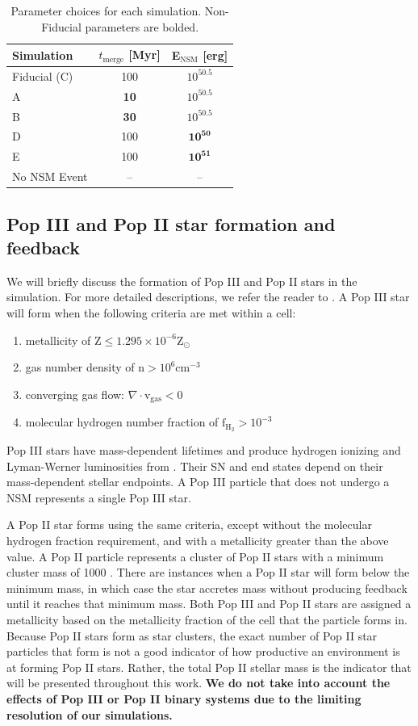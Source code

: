 \documentclass[fleqn,usenatbib]{mnras}
\begin{document}
\begin{table}
	\centering
	\begin{tabular}{lcc} 
		\hline
		Simulation & $t_{\textrm{merge}}$ [Myr] & E$_{\textrm{NSM}}$ [erg] \\
		\hline
		Fiducial (C) & 100 & $10^{50.5}$ \\
		A & \textbf{10} & $10^{50.5}$ \\
		B & \textbf{30} & $10^{50.5}$ \\
		D & 100 & $\mathbf{10^{50}}$ \\
		E & 100 & $\mathbf{10^{51}}$ \\
		No NSM Event & -- & -- \\
		\hline
	\end{tabular}
	\caption{Parameter choices for each simulation. Non-Fiducial parameters are bolded.}
	\label{tab:NSM_params}
\end{table}

\subsection{Pop III and Pop II star formation and feedback} \label{sec:star_formation}
We will briefly discuss the formation of Pop III and Pop II stars in the simulation. For more detailed descriptions, we refer the reader to \citet{Skinner20}. A Pop III star will form when the following criteria are met within a cell: 
\begin{enumerate}
	\item metallicity of $\mathrm{Z} \leq 1.295 \times 10^{-6} \mathrm{Z}_{\odot}$
	\item gas number density of $\mathrm{n} > 10^{6} \mathrm{cm}^{-3}$
	\item converging gas flow: $\nabla \cdot \mathrm{v}_{\mathrm{gas}} < 0$
	\item molecular hydrogen number fraction of $\mathrm{f}_{\mathrm{H}_{2}} > 10^{-3}$
\end{enumerate}
Pop III stars have mass-dependent lifetimes and produce hydrogen ionizing and Lyman-Werner luminosities from \citet{Schaerer02}. Their SN and end states depend on their mass-dependent stellar endpoints. A Pop III particle that does not undergo a NSM represents a single Pop III star. 

A Pop II star forms using the same criteria, except without the molecular hydrogen fraction requirement, and with a metallicity greater than the above value. A Pop II particle represents a cluster of Pop II stars with a minimum cluster mass of 1000 \Ms. There are instances when a Pop II star will form below the minimum mass, in which case the star accretes mass without producing feedback until it reaches that minimum mass. Both Pop III and Pop II stars are assigned a metallicity based on the metallicity fraction of the cell that the particle forms in. Because Pop II stars form as star clusters, the exact number of Pop II star particles that form is not a good indicator of how productive an environment is at forming Pop II stars. Rather, the total Pop II stellar mass is the indicator that will be presented throughout this work. \textbf{We do not take into account the effects of Pop III or Pop II binary systems due to the limiting resolution of our simulations.}
\end{document}
